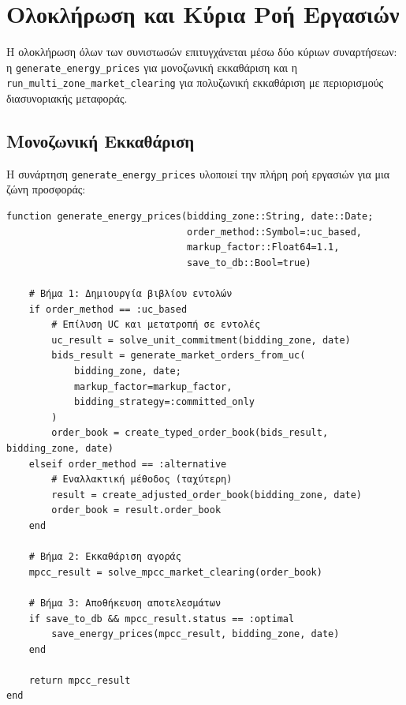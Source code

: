 \section{Ολοκλήρωση και Κύρια Ροή Εργασιών}
\label{sec:integration}

Η ολοκλήρωση όλων των συνιστωσών επιτυγχάνεται μέσω δύο κύριων συναρτήσεων: η \texttt{generate\_energy\_prices} για μονοζωνική εκκαθάριση και η \texttt{run\_multi\_zone\_market\_clearing} για πολυζωνική εκκαθάριση με περιορισμούς διασυνοριακής μεταφοράς.

\subsection{Μονοζωνική Εκκαθάριση}
\label{subsec:single-zone-clearing}

Η συνάρτηση \texttt{generate\_energy\_prices} υλοποιεί την πλήρη ροή εργασιών για μια ζώνη προσφοράς:

\begin{samepage}
\begin{verbatim}
function generate_energy_prices(bidding_zone::String, date::Date;
                                order_method::Symbol=:uc_based,
                                markup_factor::Float64=1.1,
                                save_to_db::Bool=true)
    
    # Βήμα 1: Δημιουργία βιβλίου εντολών
    if order_method == :uc_based
        # Επίλυση UC και μετατροπή σε εντολές
        uc_result = solve_unit_commitment(bidding_zone, date)
        bids_result = generate_market_orders_from_uc(
            bidding_zone, date;
            markup_factor=markup_factor,
            bidding_strategy=:committed_only
        )
        order_book = create_typed_order_book(bids_result, bidding_zone, date)
    elseif order_method == :alternative
        # Εναλλακτική μέθοδος (ταχύτερη)
        result = create_adjusted_order_book(bidding_zone, date)
        order_book = result.order_book
    end
    
    # Βήμα 2: Εκκαθάριση αγοράς
    mpcc_result = solve_mpcc_market_clearing(order_book)
    
    # Βήμα 3: Αποθήκευση αποτελεσμάτων
    if save_to_db && mpcc_result.status == :optimal
        save_energy_prices(mpcc_result, bidding_zone, date)
    end
    
    return mpcc_result
end
\end{verbatim}
\end{samepage}

